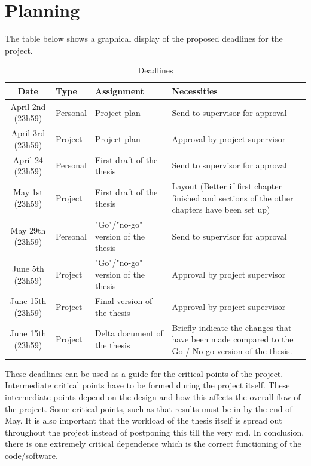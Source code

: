 \documentclass{uva-inf-article}
\begin{document}
\section{Planning}
The table below shows a graphical display of the proposed deadlines for the project.
\begin{table}[H]
\centering
\caption{Deadlines}
\label{my-label}
\begin{tabular}{cp{1cm}p{5cm}p{5cm}}
Date & Type & Assignment & Necessities  \\
\hline
April 2nd (23h59) & Personal & Project plan & Send to supervisor for approval \\
April 3rd (23h59) & Project & Project plan & Approval by project supervisor \\
April 24 (23h59) & Personal & First draft of the thesis & Send to supervisor for approval \\
May 1st (23h59) & Project & First draft of the thesis & Layout (Better if first chapter finished and sections of the other chapters have been set up)\\
May 29th (23h59) & Personal & "Go"/"no-go" version of the thesis & Send to supervisor for approval \\
June 5th (23h59) & Project & "Go"/"no-go" version of the thesis & Approval by project supervisor \\
June 15th (23h59) & Project & Final version of the thesis & Approval by project supervisor \\
June 15th (23h59) & Project & Delta document of the thesis & Briefly indicate the changes that have been made compared to the Go / No-go version of the thesis.
\end{tabular}
\end{table}

These deadlines can be used as a guide for the critical points of the project. Intermediate critical points have to be formed during the project itself. These intermediate points depend on the design and how this affects the overall flow of the project. Some critical points, such as that results must be in by the end of May. It is also important that the workload of the thesis itself is spread out throughout the project instead of postponing this till the very end. 
In conclusion, there is one extremely critical dependence which is the correct functioning of the code/software.
\end{document}
